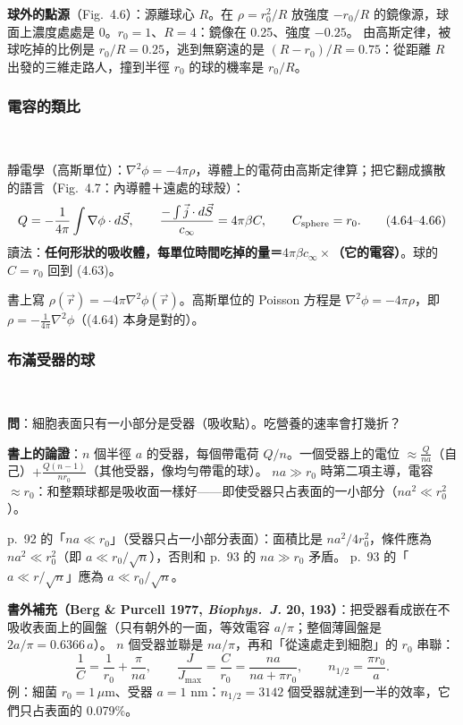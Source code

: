 \textbf{球外的點源}（Fig.~4.6）：源離球心 $R$。在 $\rho=r_0^2/R$ 放強度 $-r_0/R$ 的鏡像源，球面上濃度處處是 0。$r_0=1$、$R=4$：鏡像在 0.25、強度 $-0.25$。
由高斯定律，被球吃掉的比例是 $r_0/R=0.25$，逃到無窮遠的是 $(R-r_0)/R=0.75$：從距離 $R$ 出發的三維走路人，撞到半徑 $r_0$ 的球的機率是 $r_0/R$。

\subsubsection{電容的類比}
\ 

靜電學（高斯單位）：$\nabla^2\phi=-4\pi\rho$，導體上的電荷由高斯定律算；把它翻成擴散的語言（Fig.~4.7：內導體＋遠處的球殼）：
\[Q=-\frac1{4\pi}\int\nabla\phi\cdot d\vec S,\qquad \frac{-\int\vec j\cdot d\vec S}{c_\infty}=4\pi\beta C,\qquad C_{\rm sphere}=r_0.\tag{4.64--4.66}\]
讀法：\textbf{任何形狀的吸收體，每單位時間吃掉的量＝$4\pi\beta c_\infty\times$（它的電容）}。球的 $C=r_0$ 回到 (4.63)。
\begin{errbox}[p.~91，(4.64) 前]
書上寫 $\rho(\vec r)=-4\pi\nabla^2\phi(\vec r)$。高斯單位的 Poisson 方程是 $\nabla^2\phi=-4\pi\rho$，即 $\rho=-\frac1{4\pi}\nabla^2\phi$（(4.64) 本身是對的）。
\end{errbox}

\subsubsection{布滿受器的球}
\ 

\textbf{問}：細胞表面只有一小部分是受器（吸收點）。吃營養的速率會打幾折？

\textbf{書上的論證}：$n$ 個半徑 $a$ 的受器，每個帶電荷 $Q/n$。一個受器上的電位 $\approx\frac{Q}{na}$（自己）$+\frac{Q(n-1)}{nr_0}$（其他受器，像均勻帶電的球）。
$na\gg r_0$ 時第二項主導，電容 $\approx r_0$：和整顆球都是吸收面一樣好——即使受器只占表面的一小部分（$na^2\ll r_0^2$）。
\begin{errbox}[p.~92--93]
p.~92 的「$na\ll r_0$」（受器只占一小部分表面）：面積比是 $na^2/4r_0^2$，條件應為 $na^2\ll r_0^2$（即 $a\ll r_0/\sqrt n$），否則和 p.~93 的 $na\gg r_0$ 矛盾。
p.~93 的「$a\ll r/\sqrt n$」應為 $a\ll r_0/\sqrt n$。
\end{errbox}
\textbf{書外補充（Berg \& Purcell 1977, \emph{Biophys.\ J.} 20, 193）}：把受器看成嵌在不吸收表面上的圓盤（只有朝外的一面，等效電容 $a/\pi$；整個薄圓盤是 $2a/\pi=0.6366\,a$）。
$n$ 個受器並聯是 $na/\pi$，再和「從遠處走到細胞」的 $r_0$ 串聯：
\[\frac1C=\frac1{r_0}+\frac{\pi}{na},\qquad \frac{J}{J_{\max}}=\frac{C}{r_0}=\frac{na}{na+\pi r_0},\qquad n_{1/2}=\frac{\pi r_0}{a}.\]
例：細菌 $r_0=1\,\mu$m、受器 $a=1$ nm：$n_{1/2}=3142$ 個受器就達到一半的效率，它們只占表面的 0.079\%。
\begin{table}[H]
\centering
\small
\FourTabBP
\caption{Berg--Purcell（書外）：受器只占表面百分之幾，吸收就接近整顆球（$J_{\max}=4\pi\beta c_\infty r_0$）}\label{four-tab-bp}
\end{table}

